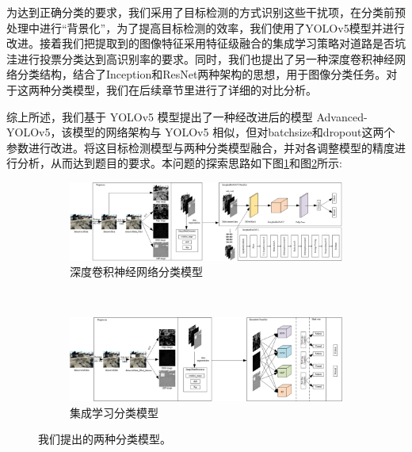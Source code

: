 \documentclass[a4paper, 10pt]{article}
\begin{document}
	为达到正确分类的要求，我们采用了目标检测的方式识别这些干扰项，在分类前预处理中进行“背景化”，为了提高目标检测的效率，我们使用了YOLOv5模型并进行改进。接着我们把提取到的图像特征采用特征级融合的集成学习策略对道路是否坑洼进行投票分类达到高识别率的要求。同时，我们也提出了另一种深度卷积神经网络分类结构，结合了Inception和ResNet两种架构的思想，用于图像分类任务。对于这两种分类模型，我们在后续章节里进行了详细的对比分析。
	
	综上所述，我们基于 YOLOv5 模型提出了一种经改进后的模型 Advanced-YOLOv5，该模型的网络架构与 YOLOv5 相似，但对batchsize和dropout这两个参数进行改进。将这目标检测模型与两种分类模型融合，并对各调整模型的精度进行分析，从而达到题目的要求。本问题的探索思路如下图\ref{fig: proposed method1}和图\ref{fig: proposed method2}所示:
	
	\begin{figure}[htb] 
		\centering 
		
		\begin{subfigure}{\textwidth}
			\includegraphics[width=\linewidth]{picture/proposed method1}
			\caption{深度卷积神经网络分类模型}
			\label{fig: proposed method1}	
		\end{subfigure} \\
		\begin{subfigure}{\textwidth}
			\includegraphics[width=\linewidth]{picture/proposed method2}
			\caption{集成学习分类模型}
			\label{fig: proposed method2}
		\end{subfigure}	
		\caption{
			\label{fig: Our proposed method}
			我们提出的两种分类模型。
		}
	\end{figure}
	
\end{document}

